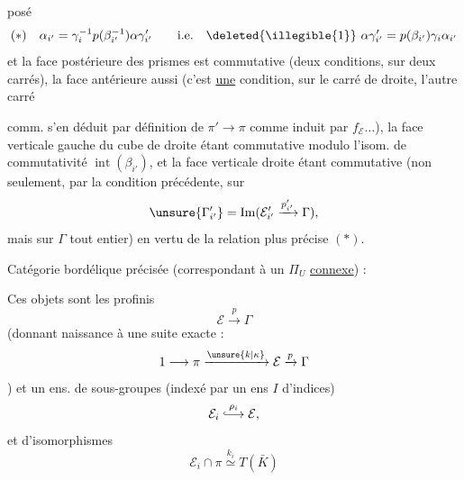 
 posé
\[
(*)\quad\alpha_{i'}=\gamma_i^{-1}p(\beta_{i'}^{-1})\alpha\gamma'_{i'}
\qquad\text{i.e.}\quad\deleted{\illegible{1}}\ \alpha\gamma'_{i'}=p(\beta_{i'})\gamma_i\alpha_{i'}
\]
et  la face  postérieure des prismes est commutative (deux conditions, sur deux carrés), la face  antérieure aussi (c'est \uline{une} condition, sur le carré de droite, l'autre carré


comm. s'en déduit par définition de $\pi'\longrightarrow\pi$ comme induit par $f_{\mathcal E}\ldots$), la face verticale gauche du cube de droite étant commutative modulo l'isom. de commutativité $\operatorname{int}(\beta_{i'})$, et la face verticale droite étant commutative (non seulement, par la condition précédente, sur
\[
\unsure{\Gamma'_{i'}}=\operatorname{Im}(\mathcal E'_{i'}\xrightarrow{p'_{i'}}\Gamma),
\]
mais sur $\Gamma$ tout entier) en vertu de la relation plus précise $(*)$.


Catégorie bordélique précisée (correspondant à un $\Pi_U$ \uline{connexe}) :

Ces objets sont les  profinis 
\[
\mathcal E\xrightarrow{p}\Gamma
\]
(donnant naissance à une suite exacte :
\[
1\longrightarrow\pi\xrightarrow{\unsure{k|\kappa}}\mathcal E\xrightarrow{p}\Gamma
\]
)
et un ens.  de sous-groupes (indexé par un ens $I$ d'indices)
\[
\mathcal E_i\overset{\rho_i}{\lhook\joinrel\longrightarrow}\mathcal E,
\]
et d'isomorphismes
\[
\mathcal E_i\cap\pi\overset{k_i}{\simeq}T(\bar K)
\]

